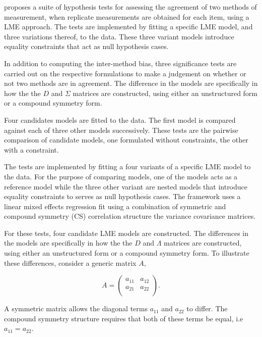 \documentclass[12pt, a4paper]{report}
\theoremstyle{plain}
\theoremstyle{definition}
\theoremstyle{remark}
\begin{document}
	\citet{ARoy2009} proposes a suite of hypothesis tests for assessing the agreement of two methods of measurement, when replicate measurements are obtained for each item, using a LME approach. The tests are implemented by fitting a specific LME model, and three variations thereof, to the data. These three variant models introduce equality constraints that act as null hypothesis cases.
	
	In addition to computing the inter-method bias, three significance tests are carried out on the respective formulations to make a judgement on whether or not two methods are in agreement. The difference in the models are specifically in how the the $D$ and $\Sigma$ matrices are constructed, using either an unstructured form or a compound symmetry form. 
	
	
	Four candidates models are fitted to the data. The first model is compared against each of three other models successively. These tests are the pairwise comparison of candidate models, one formulated without constraints, the other with a constraint.
	
	The tests are implemented by fitting a four variants of a specific LME model to the data. For the purpose of comparing models, one of the models acts as a reference model while the three other variant are nested models that introduce equality constraints to serves as null hypothesis cases. The framework uses a linear mixed effects regression fit using a combination of symmetric and compound symmetry (CS) correlation structure the variance covariance matrices.
	

	
	For these tests, four candidate LME models are constructed. The differences in the models are specifically in how the the $D$ and $\Lambda$ matrices are constructed, using either an unstructured form or a compound symmetry form. To illustrate these differences, consider a generic matrix $A$,
	
	\[
	{A} = \left( \begin{array}{cc}
	a_{11} & a_{12}  \\
	a_{21} & a_{22}  \\
	\end{array}\right).
	\]
	
	A symmetric matrix allows the diagonal terms $a_{11}$ and $a_{22}$ to differ. The compound symmetry structure requires that both of these terms be equal, i.e $a_{11} = a_{22}$.
	
	
\end{document}
